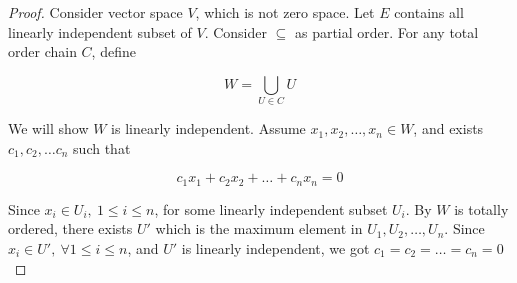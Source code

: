 \begin{proof}
   Consider vector space $V$, which is not zero space. Let $E$ contains  
   all linearly independent subset of $V$. Consider $\subseteq$ as partial order.
   For any total order chain $C$, define 

   \[
        W = \bigcup_{U \in C} U
   \]

   We will show $W$ is linearly independent. Assume $x_1, x_2, \dots, x_n \in W$, and exists $c_1,c_2,\dots c_n$ such that

   \[
    c_1x_1 + c_2 x_2 + \dots + c_n x_n = 0
   \]

    Since $x_i \in U_i,\: 1 \le i \le n$, for some linearly independent subset $U_i$. 
    By $W$ is totally ordered, there exists $U'$ which is the 
    maximum element in $U_1,U_2,\dots ,U_n$. Since $x_i \in U', \: \forall 1 \le i \le n$, 
    and $U'$ is linearly independent, we got $c_1 = c_2 = \dots = c_n = 0$

\end{proof}